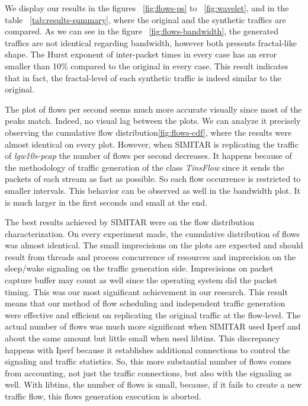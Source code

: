 We display our results in the figures ~\ref{fig:flows-ps} to ~\ref{fig:wavelet}, and in the table ~\ref{tab:results-summary}, where the original and the synthetic traffics are compared. As we can see in the figure ~\ref{fig:flows-bandwidth}, the generated traffics are not identical regarding bandwidth, however both presents fractal-like shape. The Hurst exponent of inter-packet times in every case has an error smaller than 10\% compared to the original in every case. This result indicates that in fact, the fractal-level of each synthetic traffic is indeed similar to the original.  

The plot of flows per second seems much more accurate visually since most of the peaks match.  Indeed, no visual lag between the plots. We can analyze it precisely observing the cumulative flow distribution\ref{fig:flows-cdf}, where the results were almost identical on every plot. However, when SIMITAR is replicating the traffic of \textit{lgw10s-pcap} the number of flows per second decreases. It happens because of the methodology of traffic generation of the class \textit{TinsFlow} since it sends the packets of each stream as fast as possible. So each flow occurrence is restricted to smaller intervals. This behavior can be observed as well in the bandwidth plot. It is much larger in the first seconds and small at the end.

The best results achieved by SIMITAR were on the flow distribution characterization. On every experiment made, the cumulative distribution of flows was almost identical. The small imprecisions on the plots are expected and should result from threads and process concurrence of resources and imprecision on the sleep/wake signaling on the traffic generation side. Imprecisions on packet capture buffer may count as well since the operating system did the packet timing. This was our most significant achievement in our research. This result means that our method of flow scheduling and independent traffic generation were effective and efficient on replicating the original traffic at the flow-level. The actual number of flows was much more significant when SIMITAR used Iperf and about the same amount but little small when used libtins. This discrepancy happens with Iperf because it establishes additional connections to control the signaling and traffic statistics.  So, this more substantial number of flows comes from accounting, not just the traffic connections, but also with the signaling as well.  With libtins, the number of flows is small, because, if it fails to create a new traffic flow, this flows generation execution is aborted. 

